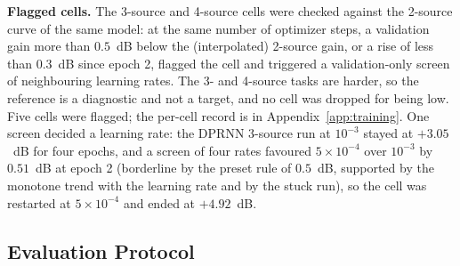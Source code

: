 \documentclass[journal]{IEEEtran}
\begin{document}
\textbf{Flagged cells.} The 3-source and 4-source cells were checked against the 2-source curve of the same model: at the same
number of optimizer steps, a validation gain more than $0.5$~dB below the (interpolated) 2-source gain, or a rise of less than $0.3$~dB since epoch 2,
flagged the cell and triggered a validation-only screen of neighbouring learning rates. The 3- and 4-source tasks are harder, so the reference is a diagnostic and not a target, and
no cell was dropped for being low. Five cells were flagged; the per-cell record is in Appendix~\ref{app:training}. One screen decided a learning rate: the DPRNN 3-source run at $10^{-3}$ stayed at $+3.05$~dB for four epochs, and a screen of four rates favoured $5\times10^{-4}$ over $10^{-3}$ by $0.51$~dB at epoch 2
(borderline by the preset rule of $0.5$~dB, supported by the monotone trend with the learning rate and by the stuck run), so the cell was restarted at $5\times10^{-4}$ and ended at $+4.92$~dB.

\subsection{Evaluation Protocol}
\end{document}
